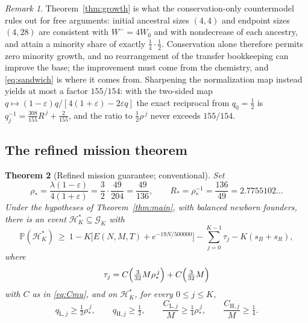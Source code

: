 \documentclass[11pt,a4paper]{article}
\theoremstyle{plain}
\newtheorem{theorem}{Theorem}[section]
\theoremstyle{definition}
\theoremstyle{remark}
\newtheorem{remark}[theorem]{Remark}
\newcommand{\Prob}{\mathbb P}
\newcommand{\eps}{\varepsilon}
\newcommand{\lo}{\mathrm L}
\newcommand{\hi}{\mathrm H}
\begin{document}
\begin{remark}
Theorem~\ref{thm:growth} is what the conservation-only countermodel rules out
for free arguments: initial ancestral sizes $(4,4)$ and endpoint sizes
$(4,28)$ are consistent with $W^-=4W_0$ and with nondecrease of each ancestry,
and attain a minority share of exactly $\frac14\cdot\frac12$. Conservation alone
therefore permits zero minority growth, and no rearrangement of the transfer
bookkeeping can improve the base; the improvement must come from the chemistry,
and \eqref{eq:sandwich} is where it comes from. Sharpening the normalization
map instead yields at most a factor $155/154$: with the two-sided map
$q\mapsto(1-\eps)q/[4(1+\eps)-2\eps q]$ the exact reciprocal from $q_0=\frac12$
is $q_j^{-1}=\frac{308}{155}R^{\,j}+\frac2{155}$, and the ratio to
$\frac12\rho^{\,j}$ never exceeds $155/154$.
\end{remark}

\subsection{The refined mission theorem}\label{sec:refined}

\begin{theorem}[Refined mission guarantee; conventional]\label{thm:refined}
Set
\begin{equation}\label{eq:rhostar}
\rho_*=\frac{\lambda(1-\eps)}{4(1+\eps)}=\frac32\cdot\frac{49}{204}=\frac{49}{136},
\qquad R_*=\rho_*^{-1}=\frac{136}{49}=2.7755102\ldots
\end{equation}
Under the hypotheses of Theorem~\ref{thm:main}, with balanced newborn founders,
there is an event $\mathcal H_K^*\subseteq\mathcal G_K$ with
\begin{equation}\label{eq:probrefined}
\Prob(\mathcal H^*_K)\ \ge\ 1-K\bigl[E(N,M,T)+e^{-19N/500000}\bigr]
-\sum_{j=0}^{K-1}\tau_j-K(s_B+s_R),
\end{equation}
where
\begin{equation}\label{eq:tau}
\tau_j=C\Bigl(\tfrac3{32}M\rho_*^{\,j}\Bigr)+C\Bigl(\tfrac3{32}M\Bigr)
\end{equation}
with $C$ as in \eqref{eq:Cmu}, and on $\mathcal H_K^*$, for every $0\le j\le K$,
\begin{equation}\label{eq:floorsrefined}
q_{\lo,j}\ge\tfrac12\rho_*^{\,j},\qquad q_{\hi,j}\ge\tfrac12,\qquad
\frac{C_{\lo,j}}M\ge\tfrac14\rho_*^{\,j},\qquad \frac{C_{\hi,j}}M\ge\tfrac14 .
\end{equation}
\end{theorem}
\end{document}
